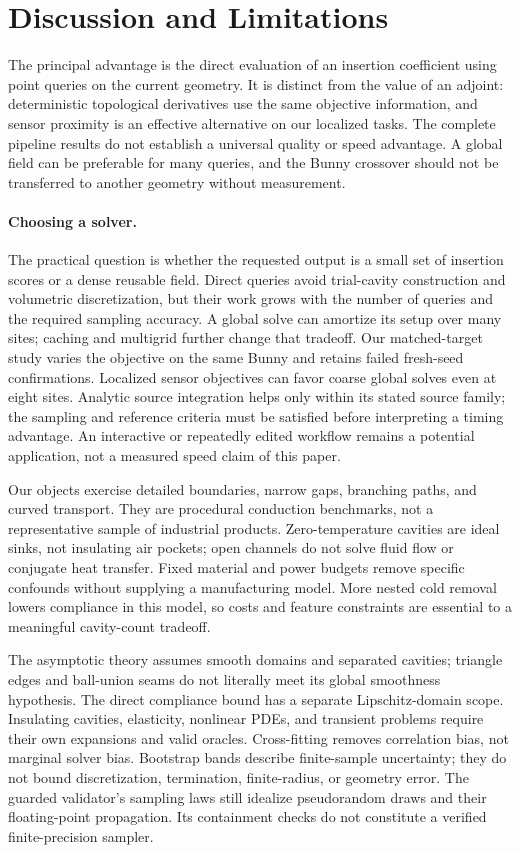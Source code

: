\section{Discussion and Limitations}
\label{sec:discussion}

The principal advantage is the direct evaluation of an insertion coefficient
using point queries on the current geometry. It is distinct from the value
of an adjoint: deterministic topological derivatives use the same objective
information, and sensor proximity is an effective alternative on our localized
tasks. The complete pipeline results do not establish a universal quality or
speed advantage. A global field can be preferable for many queries, and the
Bunny crossover should not be transferred to another geometry without measurement.

\paragraph{Choosing a solver.}
The practical question is whether the requested output is a small set of
insertion scores or a dense reusable field. Direct queries avoid trial-cavity
construction and volumetric discretization, but their work grows with the
number of queries and the required sampling accuracy. A global solve can
amortize its setup over many sites; caching and multigrid further change that
tradeoff. Our matched-target study varies the objective on the same Bunny and retains
failed fresh-seed confirmations. Localized sensor objectives can favor coarse
global solves even at eight sites. Analytic source integration helps only
within its stated source family; the sampling and reference criteria must
be satisfied before interpreting a timing advantage.
An interactive or repeatedly edited workflow remains a potential application,
not a measured speed claim of this paper.

Our objects exercise detailed boundaries, narrow gaps, branching paths, and
curved transport. They are procedural conduction benchmarks, not a representative
sample of industrial products. Zero-temperature cavities are ideal sinks,
not insulating air pockets; open channels do not solve fluid flow or conjugate
heat transfer. Fixed material and power budgets remove specific confounds
without supplying a manufacturing model. More nested cold removal lowers
compliance in this model, so costs and feature constraints are essential
to a meaningful cavity-count tradeoff.

The asymptotic theory assumes smooth domains and separated cavities; triangle
edges and ball-union seams do not literally meet its global smoothness
hypothesis. The direct compliance bound has a separate Lipschitz-domain scope.
Insulating cavities, elasticity, nonlinear PDEs, and transient problems require
their own expansions and valid oracles. Cross-fitting removes correlation bias,
not marginal solver bias. Bootstrap bands describe finite-sample uncertainty;
they do not bound discretization, termination, finite-radius, or geometry error.
The guarded validator's sampling laws still idealize pseudorandom draws and
their floating-point propagation. Its containment checks do not constitute
a verified finite-precision sampler.

